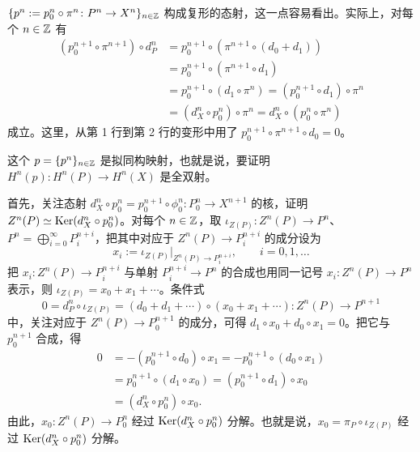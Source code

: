 
$\{p^n:=p_0^n\circ\pi^n\colon P^n\to X^n\}_{n\in\mathbb{Z}}$ 构成复形的态射，这一点容易看出。实际上，对每个 $n\in\mathbb{Z}$ 有
\begin{align*}
  (p_0^{n+1}\circ\pi^{n+1})\circ d_P^n
  &= p_0^{n+1}\circ(\pi^{n+1}\circ(d_0+d_1))\\
  &= p_0^{n+1}\circ(\pi^{n+1}\circ d_1)\\
  &= p_0^{n+1}\circ(d_1\circ\pi^n) = (p_0^{n+1}\circ d_1)\circ\pi^n\\
  &= (d_X^n\circ p_0^n)\circ\pi^n = d_X^n\circ(p_0^n\circ\pi^n)
\end{align*}
成立。这里，从第 1 行到第 2 行的变形中用了 $p_0^{n+1}\circ\pi^{n+1}\circ d_0=0$。

这个 $p=\{p^n\}_{n\in\mathbb{Z}}$ 是拟同构映射，也就是说，要证明 $H^n(p)\colon H^n(P)\to H^n(X)$ 是全双射。

首先，关注态射 $d_X^n\circ p_0^n=p_0^{n+1}\circ\phi_0^n\colon P_0^n\to X^{n+1}$ 的核，证明 $Z^n(P)\simeq\operatorname{Ker}(d_X^n\circ p_0^n)$。对每个 $n\in\mathbb{Z}$，取 $\iota_{Z(P)}\colon Z^n(P)\to P^n$、$P^n=\bigoplus_{i=0}^\infty P_i^{n+i}$，把其中对应于 $Z^n(P)\to P_i^{n+i}$ 的成分设为
\begin{equation}
  x_i:=\iota_{Z(P)}|_{Z^n(P)\to P_i^{n+i}},\qquad i=0,1,\ldots \tag{5.19}
\end{equation}
把 $x_i\colon Z^n(P)\to P_i^{n+i}$ 与单射 $P_i^{n+i}\to P^n$ 的合成也用同一记号 $x_i\colon Z^n(P)\to P^n$ 表示，则 $\iota_{Z(P)}=x_0+x_1+\cdots$。条件式
\[
  0=d_P^n\circ\iota_{Z(P)}=(d_0+d_1+\cdots)\circ(x_0+x_1+\cdots)\colon Z^n(P)\to P^{n+1}
\]
中，关注对应于 $Z^n(P)\to P_0^{n+1}$ 的成分，可得 $d_1\circ x_0+d_0\circ x_1=0$。把它与 $p_0^{n+1}$ 合成，得
\begin{align*}
  0 &= -(p_0^{n+1}\circ d_0)\circ x_1 = -p_0^{n+1}\circ(d_0\circ x_1)\\
    &= p_0^{n+1}\circ(d_1\circ x_0) = (p_0^{n+1}\circ d_1)\circ x_0\\
    &= (d_X^n\circ p_0^n)\circ x_0.
\end{align*}
由此，$x_0\colon Z^n(P)\to P_0^n$ 经过 $\operatorname{Ker}(d_X^n\circ p_0^n)$ 分解。也就是说，$x_0=\pi_P\circ\iota_{Z(P)}$ 经过 $\operatorname{Ker}(d_X^n\circ p_0^n)$ 分解。

